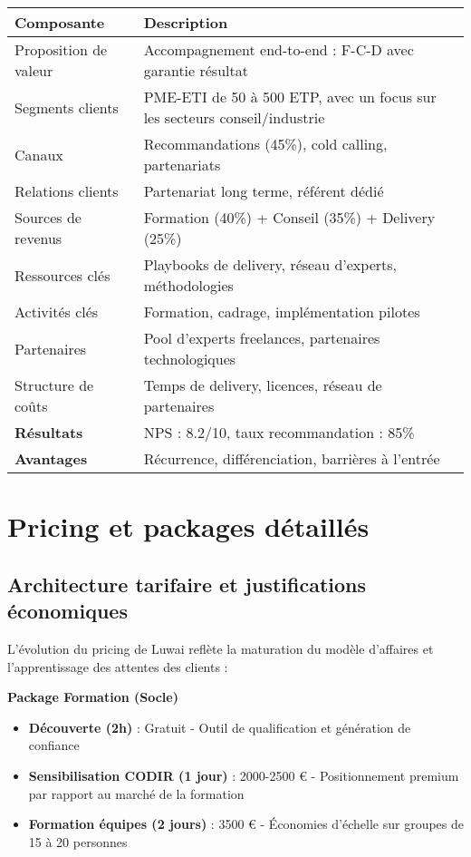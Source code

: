 \begin{longtable}{@{}>{\raggedright\arraybackslash}p{4cm}>{\raggedright\arraybackslash}p{10cm}@{}}
\toprule
\textbf{Composante} & \textbf{Description} \\
\midrule
Proposition de valeur & Accompagnement end-to-end : F-C-D avec garantie résultat \\
Segments clients & PME-ETI de 50 à 500 ETP, avec un focus sur les secteurs conseil/industrie \\
Canaux & Recommandations (45\%), cold calling, partenariats \\
Relations clients & Partenariat long terme, référent dédié \\
Sources de revenus & Formation (40\%) + Conseil (35\%) + Delivery (25\%) \\
Ressources clés & Playbooks de delivery, réseau d'experts, méthodologies \\
Activités clés & Formation, cadrage, implémentation pilotes \\
Partenaires & Pool d'experts freelances, partenaires technologiques \\
Structure de coûts & Temps de delivery, licences, réseau de partenaires \\
\midrule
\textbf{Résultats} & NPS : 8.2/10, taux recommandation : 85\% \\
\textbf{Avantages} & Récurrence, différenciation, barrières à l'entrée \\
\bottomrule
\end{longtable}

\section{Pricing et packages détaillés}

\subsection{Architecture tarifaire et justifications économiques}

L'évolution du pricing de Luwai reflète la maturation du modèle d'affaires et l'apprentissage des attentes des clients :

\textbf{Package Formation (Socle)}
\begin{itemize}
    \item \textbf{Découverte (2h)} : Gratuit - Outil de qualification et génération de confiance
    \item \textbf{Sensibilisation CODIR (1 jour)} : 2000-2500 € - Positionnement premium par rapport au marché de la formation
    \item \textbf{Formation équipes (2 jours)} : 3500 € - Économies d'échelle sur groupes de 15 à 20 personnes
\end{itemize}


